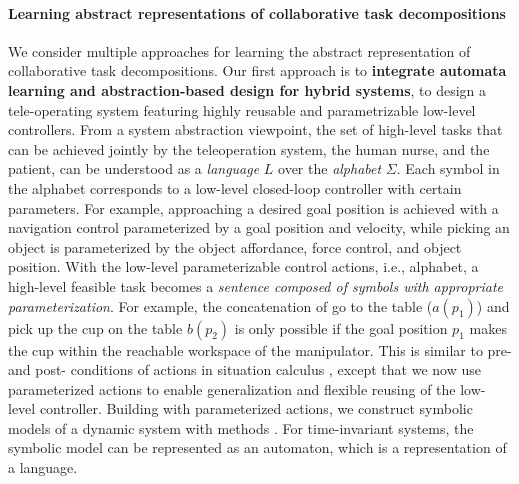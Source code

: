\documentclass[letterpaper, 11 pt, onecolumn]{article}
\newcommand{\zhi}[1]{\textcolor{blue}{ZL: #1}}
\begin{document}
\paragraph*{Learning abstract representations of collaborative task decompositions}
We consider multiple approaches for learning the abstract representation of collaborative task decompositions. Our first approach is to \textbf{integrate automata learning and abstraction-based design for hybrid systems}, to design a tele-operating system featuring highly reusable and parametrizable low-level controllers. From a system abstraction viewpoint, the set of high-level tasks that can be achieved jointly by the teleoperation system, the human nurse, and the patient, can be understood as a \emph{language} $L$ over the \emph{alphabet} $\Sigma$. Each symbol in the alphabet corresponds to a low-level closed-loop controller with certain parameters. For example, approaching a desired goal position is achieved with a navigation control parameterized by a goal position and velocity, while picking an object is parameterized by the object affordance, force control, and object position. With the low-level parameterizable control actions, i.e., alphabet, a high-level feasible task becomes a \emph{sentence composed of symbols with appropriate parameterization}. For example, the concatenation of go to the table ($a(p_1)$) and pick up the cup on the table $b(p_2)$ is only possible if the goal position $p_1$ makes the cup within the reachable workspace of the manipulator. This is similar to pre- and post- conditions of actions in situation calculus \cite{}, except that we now use parameterized actions to enable generalization and flexible reusing of the low-level controller. Building with parameterized actions, we construct symbolic models of a dynamic system with methods \cite{fu2013bottom}. For time-invariant systems, the symbolic model can be represented as an automaton, which is a representation of a language.

\end{document}
